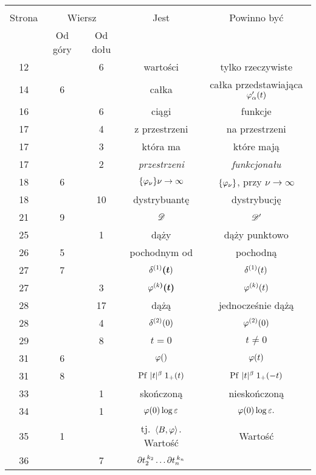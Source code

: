\documentclass[a4paper,11pt]{article}
\begin{document}
\newpage
{}
\begin{center}
  \begin{tabular}{|c|c|c|c|c|}
    \hline
    & \multicolumn{2}{c|}{} & & \\
    Strona & \multicolumn{2}{c|}{Wiersz} & Jest
                              & Powinno być \\ \cline{2-3}
    & Od góry & Od dołu & & \\
    \hline
    12 & & 6 & wartości & tylko rzeczywiste \\
    14 & 6 & & całka & całka przedstawiająca $\varphi_{ \alpha }'( t )$ \\
    16 & & 6 & ciągi & funkcje \\
    17 & & 4 & z przestrzeni & na przestrzeni \\
    17 & & 3 & która ma & które mają \\
    17 & & 2 & \emph{przestrzeni} & \emph{funkcjonału} \\
    18 & 6 & & $\{ \varphi_{ \nu } \}\nu \to \infty$ & $\{ \varphi_{ \nu } \}$,
                                                   przy $\nu \to \infty$ \\
    18 & & 10 & dystrybuantę & dystrybucję \\
    21 & 9 & & $\mathcal{D}$ & $\mathcal{D}'$ \\
    25 & & 1 & dąży & dąży punktowo \\
    26 & 5 & & pochodnym od & pochodną \\
    27 & 7 & & $\delta^{ ( 1 ) }\boldsymbol{ ( t } )$ & $\delta^{ ( 1 ) }( t )$ \\
    27 & & 3 & $\varphi^{ ( k \boldsymbol{ ) } }\boldsymbol{ ( t ) } $
           & $\varphi^{ ( k ) }( t )$ \\
    28 & & 17 & dążą & jednocześnie dążą \\
    28 & & 4 & $\delta^{ ( 2 ) }( 0 )$ & $\varphi^{ ( 2 ) }( 0 )$ \\
    29 & & 8 & $t = 0$ & $t \neq 0$ \\
    31 & 6 & & $\varphi( )$ & $\varphi( t )$ \\
    31 & 8 & & $\mathrm{Pf}\, \, | t |^{ \beta } \; 1_{ + }( t )$
           & $\mathrm{Pf}\, \, | t |^{ \beta } \; 1_{ + }( -t )$ \\
    33 & & 1 & skończoną & nieskończoną \\
    34 & & 1 & $\varphi( 0 ) \log\varepsilon$ & $\varphi( 0 ) \log\varepsilon.$ \\
    35 & 1 & & tj.~$\langle B, \varphi \rangle$. Wartość & Wartość \\
    36 & & 7 & $\partial t_{ 2 }^{ \: k_{ 2 } } \ldots \partial t_{ n }^{ \: k_{ n } }$

\end{tabular}
\end{center}
\end{document}
